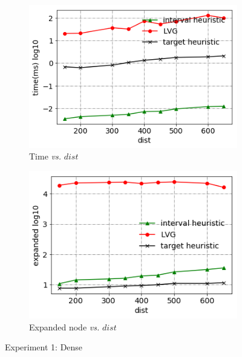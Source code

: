 \begin{figure}[!htbp]
    \centering
    
    \begin{subfigure}[b]{0.5\textwidth}
        \centering
        \includegraphics[width=.7\textwidth]{pic/e1_dense_time.png}
        \caption{Time \textit{vs.} $dist$}
        \label{e1_dense_time}
    \end{subfigure}%
    \hfill
    \begin{subfigure}[b]{0.5\textwidth}
        \centering
        \includegraphics[width=.7\textwidth]{pic/e1_dense_gen.png}
        \caption{\small Expanded node \textit{vs.} $dist$}
        \label{e1_dense_gen}
    \end{subfigure}
    \caption{\small Experiment 1: Dense}
\end{figure}

